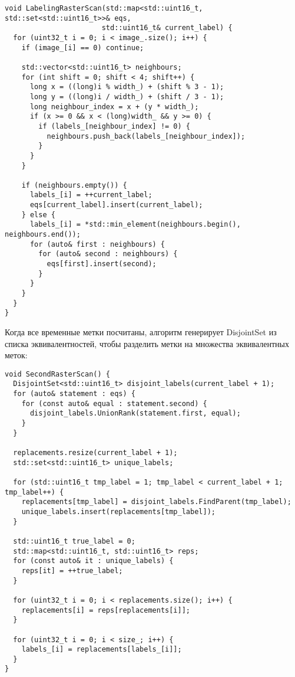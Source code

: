 \documentclass[a4paper,14pt]{article}
\begin{document}
\begin{lstlisting}[caption=Основная логика последовательной версии]
void LabelingRasterScan(std::map<std::uint16_t, std::set<std::uint16_t>>& eqs,
                       std::uint16_t& current_label) {
  for (uint32_t i = 0; i < image_.size(); i++) {
    if (image_[i] == 0) continue;
    
    std::vector<std::uint16_t> neighbours;
    for (int shift = 0; shift < 4; shift++) {
      long x = ((long)i % width_) + (shift % 3 - 1);
      long y = ((long)i / width_) + (shift / 3 - 1);
      long neighbour_index = x + (y * width_);
      if (x >= 0 && x < (long)width_ && y >= 0) {
        if (labels_[neighbour_index] != 0) {
          neighbours.push_back(labels_[neighbour_index]);
        }
      }
    }

    if (neighbours.empty()) {
      labels_[i] = ++current_label;
      eqs[current_label].insert(current_label);
    } else {
      labels_[i] = *std::min_element(neighbours.begin(), neighbours.end());
      for (auto& first : neighbours) {
        for (auto& second : neighbours) {
          eqs[first].insert(second);
        }
      }
    }
  }
}
\end{lstlisting}

Когда все временные метки посчитаны, алгоритм генерирует DisjointSet из списка эквивалентностей, чтобы разделить метки на множества эквивалентных меток:

\begin{lstlisting}[caption=Основная логика последовательной версии]
void SecondRasterScan() {
  DisjointSet<std::uint16_t> disjoint_labels(current_label + 1);
  for (auto& statement : eqs) {
    for (const auto& equal : statement.second) {
      disjoint_labels.UnionRank(statement.first, equal);
    }
  }

  replacements.resize(current_label + 1);
  std::set<std::uint16_t> unique_labels;

  for (std::uint16_t tmp_label = 1; tmp_label < current_label + 1; tmp_label++) {
    replacements[tmp_label] = disjoint_labels.FindParent(tmp_label);
    unique_labels.insert(replacements[tmp_label]);
  }

  std::uint16_t true_label = 0;
  std::map<std::uint16_t, std::uint16_t> reps;
  for (const auto& it : unique_labels) {
    reps[it] = ++true_label;
  }

  for (uint32_t i = 0; i < replacements.size(); i++) {
    replacements[i] = reps[replacements[i]];
  }

  for (uint32_t i = 0; i < size_; i++) {
    labels_[i] = replacements[labels_[i]];
  }
}
\end{lstlisting}
\end{document}
